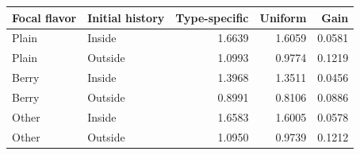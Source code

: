 \begin{tabular}{llrrr}\toprule
Focal flavor & Initial history & Type-specific & Uniform & Gain\\\midrule
Plain & Inside & 1.6639 & 1.6059 & 0.0581 \\
Plain & Outside & 1.0993 & 0.9774 & 0.1219 \\
Berry & Inside & 1.3968 & 1.3511 & 0.0456 \\
Berry & Outside & 0.8991 & 0.8106 & 0.0886 \\
Other & Inside & 1.6583 & 1.6005 & 0.0578 \\
Other & Outside & 1.0950 & 0.9739 & 0.1212 \\
\bottomrule\end{tabular}
